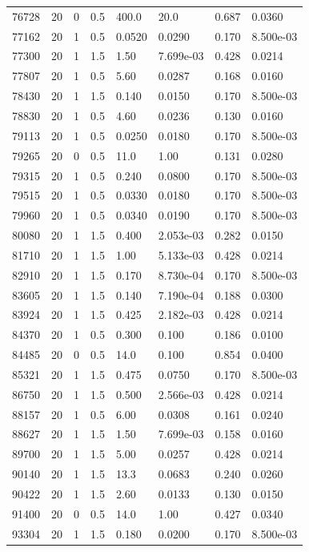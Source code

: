 \documentclass[preview]{standalone}
\begin{document}
{{{{\begin{tabular}{L{1.2cm}C{1.2cm} C{0.3cm}C{0.5cm} C{1.4cm}C{1.4cm} C{1.4cm}C{1.4cm}}
  76728  &    20  & 0     & 0.5 &  400.0  & 20.0  & 0.687 &  0.0360   \\ 
  77162  &    20  & 1     & 0.5 &  0.0520  & 0.0290  & 0.170 &  8.500e-03   \\ 
  77300  &    20  & 1     & 1.5 &  1.50  & 7.699e-03  & 0.428 &  0.0214   \\ 
  77807  &    20  & 1     & 0.5 &  5.60  & 0.0287  & 0.168 &  0.0160   \\ 
  78430  &    20  & 1     & 1.5 &  0.140  & 0.0150  & 0.170 &  8.500e-03   \\ 
  78830  &    20  & 1     & 0.5 &  4.60  & 0.0236  & 0.130 &  0.0160   \\ 
  79113  &    20  & 1     & 0.5 &  0.0250  & 0.0180  & 0.170 &  8.500e-03   \\ 
  79265  &    20  & 0     & 0.5 &  11.0  & 1.00  & 0.131 &  0.0280   \\ 
  79315  &    20  & 1     & 0.5 &  0.240  & 0.0800  & 0.170 &  8.500e-03   \\ 
  79515  &    20  & 1     & 0.5 &  0.0330  & 0.0180  & 0.170 &  8.500e-03   \\ 
  79960  &    20  & 1     & 0.5 &  0.0340  & 0.0190  & 0.170 &  8.500e-03   \\ 
  80080  &    20  & 1     & 1.5 &  0.400  & 2.053e-03  & 0.282 &  0.0150   \\ 
  81710  &    20  & 1     & 1.5 &  1.00  & 5.133e-03  & 0.428 &  0.0214   \\ 
  82910  &    20  & 1     & 1.5 &  0.170  & 8.730e-04  & 0.170 &  8.500e-03   \\ 
  83605  &    20  & 1     & 1.5 &  0.140  & 7.190e-04  & 0.188 &  0.0300   \\ 
  83924  &    20  & 1     & 1.5 &  0.425  & 2.182e-03  & 0.428 &  0.0214   \\ 
  84370  &    20  & 1     & 0.5 &  0.300  & 0.100  & 0.186 &  0.0100   \\ 
  84485  &    20  & 0     & 0.5 &  14.0  & 0.100  & 0.854 &  0.0400   \\ 
  85321  &    20  & 1     & 1.5 &  0.475  & 0.0750  & 0.170 &  8.500e-03   \\ 
  86750  &    20  & 1     & 1.5 &  0.500  & 2.566e-03  & 0.428 &  0.0214   \\ 
  88157  &    20  & 1     & 0.5 &  6.00  & 0.0308  & 0.161 &  0.0240   \\ 
  88627  &    20  & 1     & 1.5 &  1.50  & 7.699e-03  & 0.158 &  0.0160   \\ 
  89700  &    20  & 1     & 1.5 &  5.00  & 0.0257  & 0.428 &  0.0214   \\ 
  90140  &    20  & 1     & 1.5 &  13.3  & 0.0683  & 0.240 &  0.0260   \\ 
  90422  &    20  & 1     & 1.5 &  2.60  & 0.0133  & 0.130 &  0.0150   \\ 
  91400  &    20  & 0     & 0.5 &  14.0  & 1.00  & 0.427 &  0.0340   \\ 
  93304  &    20  & 1     & 1.5 &  0.180  & 0.0200  & 0.170 &  8.500e-03   \\ 
\hline 
\end{tabular} 

}}}}
\end{document}
